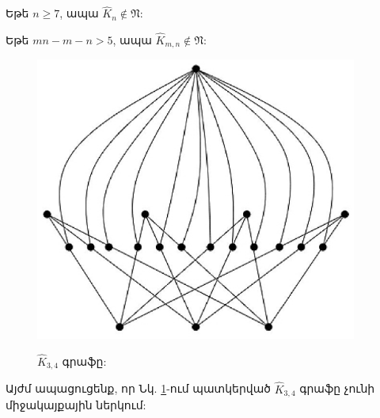 \begin{corollary}
\label{c3_subdivision_complete} Եթե $n\geq 7$, ապա $\widehat{K}_{n}\notin
\mathfrak{N}$:
\end{corollary}

\begin{corollary}
\label{c3_subdivision_complete_bipartite} Եթե $mn-m-n>5$, ապա $\widehat{K}_{m,n}\notin \mathfrak{N}$:
\end{corollary}

\begin{figure}[h]
\begin{center}
\includegraphics[width=25pc]{figures/subdivisionK34.eps}\\
\caption{$\widehat{K}_{3,4}$ գրաֆը:}\label{f3_subdivisionK34}
\end{center}
\end{figure}

Այժմ ապացուցենք, որ Նկ. \ref{f3_subdivisionK34}-ում պատկերված $\widehat{K}_{3,4}$ գրաֆը չունի միջակայքային ներկում:

